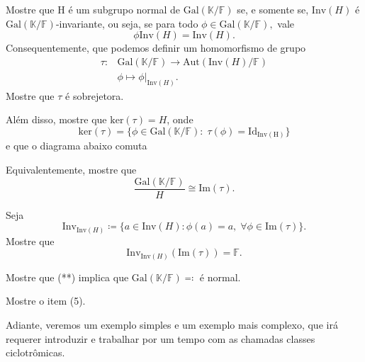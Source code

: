 \documentclass[../algebraIII_notes.tex]{subfiles}
\begin{document}
\begin{exr}
	Mostre que H é um subgrupo normal de \(\mathrm{Gal}(\mathbb{K}/\mathbb{F})\) se, e somente se, \(\mathrm{Inv}(H)\) é \(\mathrm{Gal}(\mathbb{K}/\mathbb{F})\)-invariante, ou seja, se para todo \(\phi \in \mathrm{Gal}(\mathbb{K}/\mathbb{F}),\) vale
	\[
		\phi \mathrm{Inv}(H) = \mathrm{Inv}(H).
	\]
	Consequentemente, que podemos definir um homomorfismo de grupo
	\begin{align*}
		\tau : & \mathrm{Gal}(\mathbb{K}/\mathbb{F})\rightarrow \mathrm{Aut}(\mathrm{Inv}(H)/\mathbb{F}) \\
		       & \phi\longmapsto \phi|_{\mathrm{Inv}(H)}.
	\end{align*}
	Mostre que \(\tau \) é sobrejetora.

	Além disso, mostre que \(\mathrm{ker}(\tau )=H\), onde
	\[
		\mathrm{ker}(\tau ) = \{\phi \in \mathrm{Gal}(\mathbb{K}/\mathbb{F}):\; \tau (\phi ) = \mathrm{Id}_{\mathrm{Inv(H)}}\}
	\]
	e que o diagrama abaixo comuta
	\begin{center}
	\end{center}
	Equivalentemente, mostre que
	\[
		\frac{\mathrm{Gal}(\mathbb{K}/\mathbb{F})}{H}\cong \mathrm{Im}(\tau ).
	\]
\end{exr}
\begin{exr}
	Seja
	\[
		\mathrm{Inv}_{\mathrm{Inv}(H)}\coloneqq \{a\in \mathrm{Inv}(H): \phi (a) = a,\; \forall \phi \in \mathrm{Im}(\tau )\}.
	\]
	Mostre que
	\[
		\mathrm{Inv}_{\mathrm{Inv}(H)}(\mathrm{Im}(\tau )) = \mathbb{F}.
	\]
\end{exr}
\begin{exr}
	Mostre que (**) implica que \(\mathrm{Gal}(\mathbb{K}/\mathbb{F})\eqqcolon\) é normal.
\end{exr}
\begin{exr}
	Mostre o item (5).
\end{exr}

Adiante, veremos um exemplo simples e um exemplo mais complexo, que irá requerer introduzir e trabalhar por um tempo com as chamadas classes ciclotrômicas.
\end{document}
